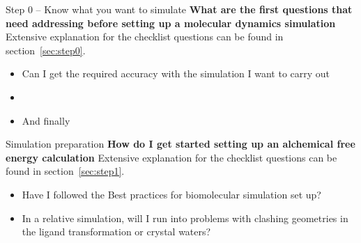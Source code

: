\documentclass[9pt,bestpractices]{livecoms}
\begin{document}
\begin{Checklists*}[p!]

\begin{checklist}{Step 0 -- Know what you want to simulate }
\textbf{What are the first questions that need addressing before setting up a molecular dynamics simulation}\\
Extensive explanation for the checklist questions can be found in section~\ref{sec:step0}.
\begin{itemize}
\item Can I get the required accuracy with the simulation I want to carry out
\item
\item And finally
\end{itemize}
\end{checklist}

\begin{checklist}{Simulation preparation}
\textbf{How do I get started setting up an alchemical free energy calculation}
Extensive explanation for the checklist questions can be found in section~\ref{sec:step1}.
\begin{itemize}
\item Have I followed the Best practices for biomolecular simulation set up?
\item In a relative simulation, will I run into problems with clashing geometries in the ligand transformation or crystal waters?
\end{itemize}
\end{checklist}
\end{Checklists*}
\end{document}

